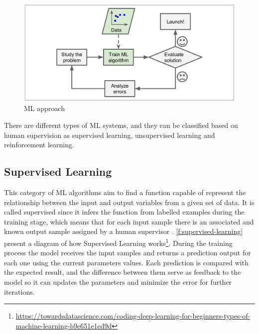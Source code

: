 \begin{figure}[h]
\centering
\includegraphics[width=\linewidth]{figures/Ch2/Ml-Approach.png}
\caption{ML approach \cite{geron2017}}
\label{f:ML-approach}
\end{figure}

There are different types of \ac{ML} systems, and they can be classified based on human supervision as supervised learning, unsupervised learning and reinforcement learning. 

\subsection{Supervised Learning}
This category of \ac{ML} algorithms aim to find a function capable of represent the relationship between the input and output variables from a given set of data. It is called supervised since it infers the function from labelled examples during the training stage, which means that for each input sample there is an associated and known output sample assigned by a human supervisor \cite{Batta2020}. \autoref{f:supervised-learning} present a diagram of how Supervised Learning works\footnote{\url{https://towardsdatascience.com/coding-deep-learning-for-beginners-types-of-machine-learning-b9e651e1ed9d}}. During the training process the model receives the input samples and returns a prediction output for each one using the current parameters values. Each prediction is compared with the expected result, and the difference between them serve as feedback to the model so it can updates the parameters and minimize the error for further iterations.

